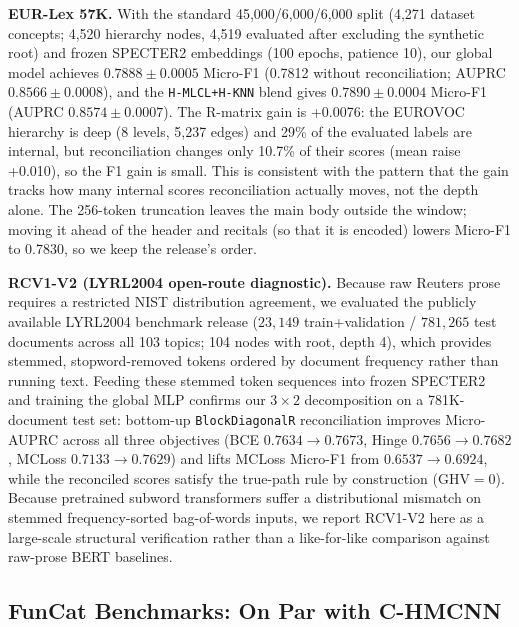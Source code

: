 \documentclass[preprint,12pt]{elsarticle}
\begin{document}
\textbf{EUR-Lex 57K.} With the standard 45,000/6,000/6,000 split
(4,271 dataset concepts; 4,520 hierarchy nodes, 4,519 evaluated after
excluding the synthetic root) and frozen SPECTER2 embeddings (100 epochs,
patience 10), our global model achieves $0.7888 \pm 0.0005$ Micro-F1
(0.7812 without reconciliation; AUPRC $0.8566 \pm 0.0008$), and the
\texttt{H-MLCL+H-KNN} blend gives $0.7890 \pm 0.0004$ Micro-F1 (AUPRC
$0.8574 \pm 0.0007$).  The R-matrix gain is +0.0076: the
EUROVOC hierarchy is deep (8 levels, 5,237 edges) and 29\% of the
evaluated labels are internal, but reconciliation changes only 10.7\%
of their scores (mean raise +0.010), so the F1 gain is small.  This is
consistent with the pattern that the gain tracks how many internal
scores reconciliation actually moves, not the depth alone.  The
256-token truncation leaves the main body outside the window; moving it
ahead of the header and recitals (so that it is encoded) lowers Micro-F1
to 0.7830, so we keep the release's order.

\textbf{RCV1-V2 (LYRL2004 open-route diagnostic).} Because raw Reuters prose
requires a restricted NIST distribution agreement, we evaluated the publicly
available LYRL2004 benchmark release ($23{,}149$ train+validation / $781{,}265$
test documents across all 103 topics; 104 nodes with root, depth 4), which
provides stemmed, stopword-removed tokens ordered by document frequency rather
than running text. Feeding these stemmed token sequences into frozen SPECTER2
and training the global MLP confirms our $3 \times 2$ decomposition on a
781K-document test set: bottom-up \texttt{BlockDiagonalR} reconciliation
improves Micro-AUPRC across all three objectives (BCE $0.7634 \to 0.7673$,
Hinge $0.7656 \to \mathbf{0.7682}$, MCLoss $0.7133 \to 0.7629$) and lifts
MCLoss Micro-F1 from $0.6537 \to \mathbf{0.6924}$, while the reconciled scores
satisfy the true-path rule by construction ($\text{GHV}=0$). Because
pretrained subword transformers suffer a
distributional mismatch on stemmed frequency-sorted bag-of-words inputs, we
report RCV1-V2 here as a large-scale structural verification rather than a
like-for-like comparison against raw-prose BERT baselines.

\subsection{FunCat Benchmarks: On Par with C-HMCNN}
\end{document}
